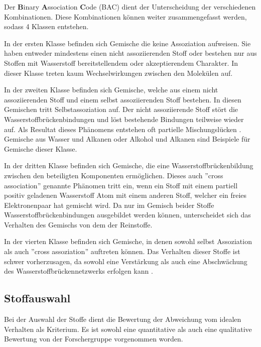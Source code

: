 \documentclass[../thesis.tex]{subfiles}
\begin{document}
Der \textbf{B}inary \textbf{A}ssociation \textbf{C}ode (BAC) dient der Unterscheidung der verschiedenen Kombinationen. Diese Kombinationen können weiter zusammengefasst werden, sodass 4 Klassen entstehen.

In der ersten Klasse befinden sich Gemische die keine Assoziation aufweisen. Sie haben entweder mindestens einen nicht assoziierenden Stoff oder bestehen nur aus Stoffen mit Wasserstoff bereitstellendem oder akzeptierendem Charakter. In dieser Klasse treten kaum Wechselwirkungen zwischen den Molekülen auf.

In der zweiten Klasse befinden sich Gemische, welche aus einem nicht assoziierenden Stoff und einem selbst assoziierenden Stoff bestehen. In diesen Gemischen tritt Selbstassoziation auf. Der nicht assoziierende Stoff stört die Wasserstoffbrückenbindungen und löst bestehende Bindungen teilweise wieder auf. Als Resultat dieses Phänomens entstehen oft partielle Mischungslücken \cite{jaubert2020benchmark}. Gemische aus Wasser und Alkanen oder Alkohol und Alkanen sind Beispiele für Gemische dieser Klasse.

In der dritten Klasse befinden sich Gemische, die eine Wasserstoffbrückenbildung zwischen den beteiligten Komponenten ermöglichen. Dieses auch ''cross association'' genannte Phänomen tritt ein, wenn ein Stoff mit einem partiell positiv geladenen Wasserstoff Atom mit einem anderen Stoff, welcher ein freies Elektronenpaar hat gemischt wird. Da nur im Gemisch beider Stoffe Wasserstoffbrückenbindungen ausgebildet werden können, unterscheidet sich das Verhalten des Gemischs von dem der Reinstoffe.

In der vierten Klasse befinden sich Gemische, in denen sowohl selbst Assoziation als auch ''cross assoziation'' auftreten können. Das Verhalten dieser Stoffe ist schwer vorherzusagen, da sowohl eine Verstärkung als auch eine Abschwächung des Wasserstoffbrückennetzwerks erfolgen kann \cite{jaubert2020benchmark}.

\subsection{Stoffauswahl}

Bei der Auswahl der Stoffe dient die Bewertung der Abweichung vom idealen Verhalten als Kriterium. Es ist sowohl eine quantitative als auch eine qualitative Bewertung von der Forschergruppe vorgenommen worden.
\end{document}
